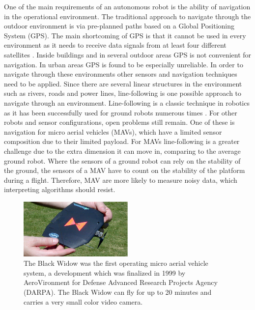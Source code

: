 \documentclass[a4paper]{article}
\begin{document}
One of the main requirements of an autonomous robot is the ability of navigation in the operational environment. The traditional approach to navigate through the outdoor environment is via pre-planned paths based on a Global Positioning System (GPS). The main shortcoming of GPS is that it cannot be used in every environment as it needs to receive data signals from at least four different satellites \cite{Bajaj2002}. Inside buildings and in several outdoor areas GPS is not convenient for navigation. In urban areas GPS is found to be especially unreliable. In order to navigate through these environments other sensors and navigation techniques need to be applied. Since there are several linear structures in the environment such as rivers, roads and power lines, line-following is one possible approach to navigate through an environment. Line-following is a classic technique in robotics as it has been successfully used for ground robots numerous times \cite{Sampei1995, Dupuis2006}. For other robots and sensor configurations, open problems still remain. One of these is navigation for micro aerial vehicles (MAVs), which have a limited sensor composition due to their limited payload. For MAVs line-following is a greater challenge due to the extra dimension it can move in, comparing to the average ground robot. Where the sensors of a ground robot can rely on the stability of the ground, the sensors of a MAV have to count on the stability of the platform during a flight. Therefore, MAV are more likely to measure noisy data, which interpreting algorithms should resist.

\begin{figure}[!ht]
	\centering
	\includegraphics[width=0.5\textwidth]{images/blackwidow.eps}
	\caption{The Black Widow \cite{Grasmeyer2001} was the first operating micro aerial vehicle system, a development which was finalized in 1999 by AeroVironment for Defense Advanced Research Projects Agency (DARPA). The Black Widow can fly for up to 20 minutes and carries a very small color video camera.}
	\label{blackwidow}
\end{figure}
\end{document}
